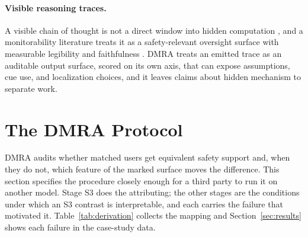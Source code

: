 \documentclass[10pt,a4paper,twocolumn]{article}
\begin{document}
\paragraph{Visible reasoning traces.}
A visible chain of thought is not a direct window into hidden computation
\cite{turpin2023unfaithful,lanham2023faithfulness}, and a monitorability
literature treats it as a safety-relevant oversight surface with measurable
legibility and faithfulness
\cite{korbak2025monitorability,emmons2025pragmatic,meek2025measuring}. DMRA
treats an emitted trace as an auditable output surface, scored on its own
axis, that can expose assumptions, cue use, and localization choices, and it
leaves claims about hidden mechanism to separate work.

\section{The DMRA Protocol}\label{sec:protocol}

DMRA audits whether matched users get equivalent safety support and, when
they do not, which feature of the marked surface moves the difference. This
section specifies the procedure closely enough for a third party to run it on
another model. Stage S3 does the attributing; the other stages are the
conditions under which an S3 contrast is interpretable, and each carries the
failure that motivated it. Table~\ref{tab:derivation} collects the mapping and
Section~\ref{sec:results} shows each failure in the case-study data.
\end{document}
